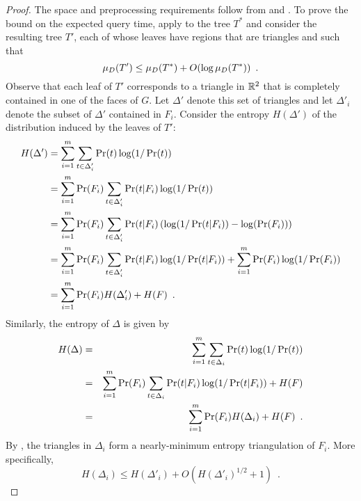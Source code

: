 \documentclass[acmtalg]{acmsmall}
\begin{document}
\begin{proof}
The space and preprocessing requirements follow from
 and .
To prove the bound on the expected query time, apply
 to the tree $T^*$ and consider the resulting tree
$T'$, each of whose leaves have regions that are triangles and such
that
\begin{equation}
     \mu_D(T') \le \mu_D(T^*) + O(\log \mu_D(T^*)) \enspace .
       \eqlabelx{t-triangle}
\end{equation}
Observe that each leaf of $T'$ corresponds to a triangle in $\mathbb{R}^2$
that is completely contained in one of the faces of $G$.  Let
$\Delta'$ denote this set of triangles and let $\Delta'_i$ denote the
subset of $\Delta'$ contained in $F_i$.
Consider the entropy $H(\Delta')$ of the distribution induced by the
leaves of $T'$:
\begin{equation}\eqlabelx{h-delta-prime}
 \begin{split}
   H(\Delta') 
     & =  \sum_{i=1}^m \sum_{t\in \Delta'_i}\Pr(t)\log(1/\Pr(t)) \\
     & =  \sum_{i=1}^m \Pr(F_i)\sum_{t\in \Delta'_i}
            \Pr(t|F_i)\log(1/\Pr(t)) \\
     & =  \sum_{i=1}^m \Pr(F_i)\sum_{t\in \Delta'_i}
            \Pr(t|F_i)
            \left(
              \log(1/\Pr(t|F_i))-\log(\Pr(F_i))
            \right) \\
     & =  \sum_{i=1}^m \Pr(F_i)\sum_{t\in \Delta'_i}
            \Pr(t|F_i)\log(1/\Pr(t|F_i)) 
             + \sum_{i=1}^m \Pr(F_i) \log(1/\Pr(F_i)) \\
     & =  \sum_{i=1}^m \Pr(F_i) H(\Delta'_i) + H(F) \enspace .
 \end{split}
\end{equation}
Similarly, the entropy of $\Delta$ is given by 
\begin{eqnarray*}
   H(\Delta) 
     & = & \sum_{i=1}^m \sum_{t\in \Delta_i}\Pr(t)\log(1/\Pr(t)) \\
     & = & \sum_{i=1}^m \Pr(F_i)\sum_{t\in \Delta_i}
            \Pr(t|F_i)\log(1/\Pr(t|F_i)) 
          + H(F) \\
     & = & \sum_{i=1}^m \Pr(F_i) H(\Delta_i) + H(F) \enspace .
      \eqlabelx{h-delta}
\end{eqnarray*}
By , the triangles in $\Delta_i$ form a
nearly-minimum entropy triangulation of $F_i$.  More specifically, 
\begin{equation}
   H(\Delta_i) \le H(\Delta'_i) + O(H(\Delta'_i)^{1/2}+1)  \enspace .

\end{equation}
\end{proof}
\end{document}
